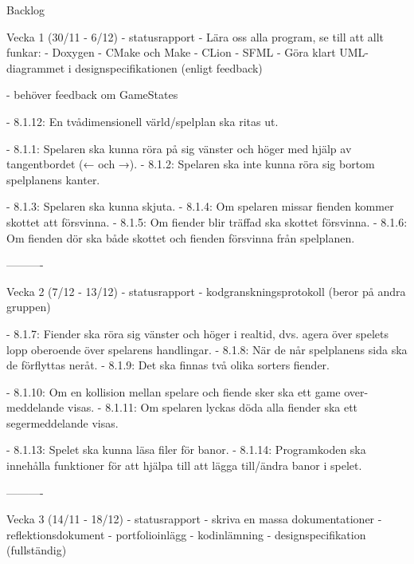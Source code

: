 Backlog

Vecka 1 (30/11 - 6/12)
- statusrapport
- Lära oss alla program, se till att allt funkar:
    - Doxygen
    - CMake och Make
    - CLion
    - SFML
- Göra klart UML-diagrammet i designspecifikationen (enligt feedback)

- behöver feedback om GameStates

- 8.1.12: En tvådimensionell värld/spelplan ska ritas ut.

- 8.1.1: Spelaren ska kunna röra på sig vänster och höger med hjälp av tangentbordet (← och →).
- 8.1.2: Spelaren ska inte kunna röra sig bortom spelplanens kanter.

- 8.1.3: Spelaren ska kunna skjuta.
- 8.1.4: Om spelaren missar fienden kommer skottet att försvinna.
- 8.1.5: Om fiender blir träffad ska skottet försvinna.
- 8.1.6: Om fienden dör ska både skottet och fienden försvinna från spelplanen.

----------

Vecka 2 (7/12 - 13/12)
- statusrapport
- kodgranskningsprotokoll (beror på andra gruppen)

- 8.1.7: Fiender ska röra sig vänster och höger i realtid, dvs. agera över spelets lopp oberoende över spelarens handlingar.
- 8.1.8: När de når spelplanens sida ska de förflyttas neråt.
- 8.1.9: Det ska finnas två olika sorters fiender.

- 8.1.10: Om en kollision mellan spelare och fiende sker ska ett game over-meddelande visas.
- 8.1.11: Om spelaren lyckas döda alla fiender ska ett segermeddelande visas.

- 8.1.13: Spelet ska kunna läsa filer för banor.
- 8.1.14: Programkoden ska innehålla funktioner för att hjälpa till att lägga till/ändra banor i spelet.

----------

Vecka 3 (14/11 - 18/12)
- statusrapport
- skriva en massa dokumentationer
    - reflektionsdokument
    - portfolioinlägg
    - kodinlämning
    - designspecifikation (fullständig)

